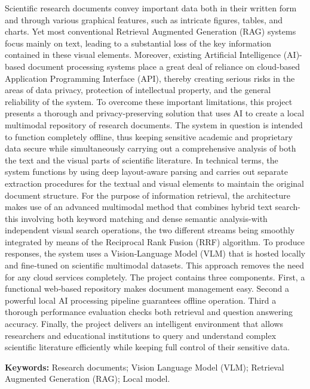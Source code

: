 \documentclass[11pt,a4paper]{report}
\begin{document}
Scientific research documents convey important data both in their written form and through various graphical features, such as intricate figures, tables, and charts. Yet most conventional Retrieval Augmented Generation (RAG) systems focus mainly on text, leading to a substantial loss of the key information contained in these visual elements. Moreover, existing Artificial Intelligence (AI)-based document processing systems place a great deal of reliance on cloud-based Application Programming Interface (API), thereby creating serious risks in the areas of data privacy, protection of intellectual property, and the general reliability of the system. To overcome these important limitations, this project presents a thorough and privacy-preserving solution that uses AI to create a local multimodal repository of research documents. The system in question is intended to function completely offline, thus keeping sensitive academic and proprietary data secure while simultaneously carrying out a comprehensive analysis of both the text and the visual parts of scientific literature. In technical terms, the system functions by using deep layout-aware parsing and carries out separate extraction procedures for the textual and visual elements to maintain the original document structure. For the purpose of information retrieval, the architecture makes use of an advanced multimodal method that combines hybrid text search-this involving both keyword matching and dense semantic analysis-with independent visual search operations, the two different streams being smoothly integrated by means of the Reciprocal Rank Fusion (RRF) algorithm. To produce responses, the system uses a Vision‑Language Model (VLM) that is hosted locally and fine‑tuned on scientific multimodal datasets. This approach removes the need for any cloud services completely. The project contains three components. First, a functional web‑based repository makes document management easy. Second a powerful local AI processing pipeline guarantees offline operation. Third a thorough performance evaluation checks both retrieval and question answering accuracy. Finally, the project delivers an intelligent environment that allows researchers and educational institutions to query and understand complex scientific literature efficiently while keeping full control of their sensitive data.


\vspace{4mm}
\noindent\textbf{Keywords:} Research documents; Vision Language Model (VLM); Retrieval Augmented Generation (RAG); Local model.
\end{document}
